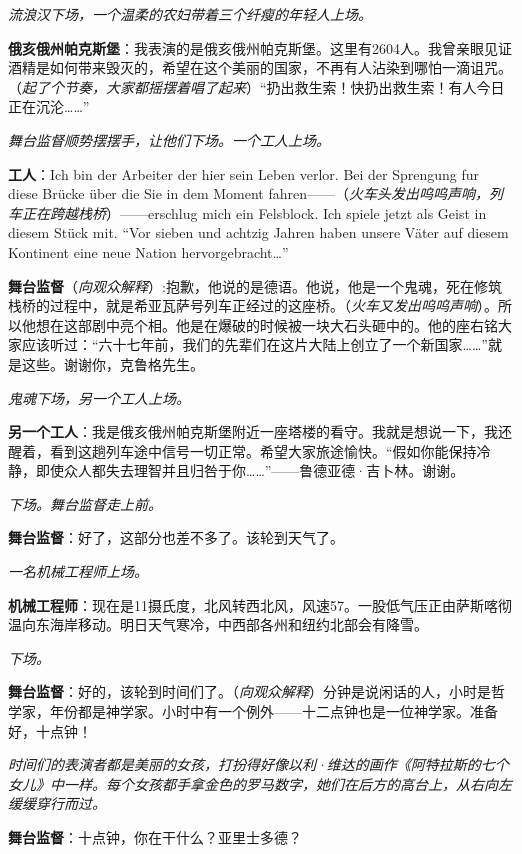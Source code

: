 \documentclass[lang=cn,newtx,12pt,scheme=chinese]{elegantbook}
\begin{document}
\textit{流浪汉下场，一个温柔的农妇带着三个纤瘦的年轻人上场。}

\textbf{俄亥俄州帕克斯堡}：我表演的是俄亥俄州帕克斯堡。这里有2604人。我曾亲眼见证酒精是如何带来毁灭的，希望在这个美丽的国家，不再有人沾染到哪怕一滴诅咒。（\textit{起了个节奏，大家都摇摆着唱了起来}）“扔出救生索！快扔出救生索！有人今日正在沉沦……”

\textit{舞台监督顺势摆摆手，让他们下场。一个工人上场。}

\textbf{工人}：Ich bin der Arbeiter der hier sein Leben verlor. Bei der Sprengung fur diese Brücke über die Sie in dem Moment fahren——（\textit{火车头发出呜呜声响，列车正在跨越栈桥}）——erschlug mich ein Felsblock. Ich spiele jetzt als Geist in diesem Stück mit. “Vor sieben und achtzig Jahren haben unsere Väter auf diesem Kontinent eine neue Nation hervorgebracht…”

\textbf{舞台监督}（\textit{向观众解释}）:抱歉，他说的是德语。他说，他是一个鬼魂，死在修筑栈桥的过程中，就是希亚瓦萨号列车正经过的这座桥。（\textit{火车又发出呜呜声响}）。所以他想在这部剧中亮个相。他是在爆破的时候被一块大石头砸中的。他的座右铭大家应该听过：“六十七年前，我们的先辈们在这片大陆上创立了一个新国家……”就是这些。谢谢你，克鲁格先生。

\textit{鬼魂下场，另一个工人上场。}

\textbf{另一个工人}：我是俄亥俄州帕克斯堡附近一座塔楼的看守。我就是想说一下，我还醒着，看到这趟列车途中信号一切正常。希望大家旅途愉快。“假如你能保持冷静，即使众人都失去理智并且归咎于你……”——鲁德亚德·吉卜林。谢谢。


\textit{下场。舞台监督走上前。}

\textbf{舞台监督}：好了，这部分也差不多了。该轮到天气了。

\textit{一名机械工程师上场。}

\textbf{机械工程师}：现在是11摄氏度，北风转西北风，风速57。一股低气压正由萨斯喀彻温向东海岸移动。明日天气寒冷，中西部各州和纽约北部会有降雪。

\textit{下场。}

\textbf{舞台监督}：好的，该轮到时间们了。（\textit{向观众解释}）分钟是说闲话的人，小时是哲学家，年份都是神学家。小时中有一个例外——十二点钟也是一位神学家。准备好，十点钟！

\textit{时间们的表演者都是美丽的女孩，打扮得好像以利·维达的画作《阿特拉斯的七个女儿》中一样。每个女孩都手拿金色的罗马数字，她们在后方的高台上，从右向左缓缓穿行而过。}

\textbf{舞台监督}：十点钟，你在干什么？亚里士多德？
\end{document}
